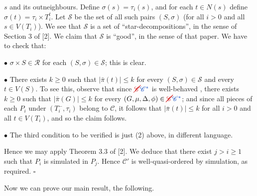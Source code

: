 \noindent $s$ and its outneighbours. Define $\sigma(s) = \tau_i(s)$, and for each $t \in N(s)$ define $\sigma(t) = \tau_i \times T_i^t$. Let $\mathscr{S}$ be the set of all such pairs $(S, \sigma)$ (for all $i > 0$ and all $s \in V(T_i)$). We see that $\mathscr{S}$ is a set of ``star-decompositions'', in the sense of Section 3 of [2]. We claim that $\mathscr{S}$ is ``good'', in the sense of that paper. We have to check that:

\hspace*{12pt}$\bullet$ $\sigma \times S \in \mathscr{R}$ for each $(S, \sigma) \in \mathscr{S}$; this is clear.

\hspace*{12pt}$\bullet$ There exists $k \ge 0$ such that $|\bar{\pi}(t)| \le k$ for every $(S, \sigma) \in \mathscr{S}$ and every $t \in V(S)$. To see this, observe that since $\delm{\mathscr{C}}\fix{\mathscr{C}^*}$ is well-behaved , there exists $k \ge 0$ such that $|\bar{\pi}(G)| \le k$ for every $(G, \mu, \Delta, \phi) \in \delm{\mathscr{C}}\fix{\mathscr{C}^*}$; and since all pieces of each $P_i$ under $(T_i^-, \tau_i)$ belong to $\mathscr{C}$, it follows that $|\bar{\pi}(t)| \le k$ for all $i > 0$ and all $t \in V(T_i)$, and so the claim follows.

\hspace*{12pt}$\bullet$ The third condition to be verified is just (2) above, in different language.

Hence we may apply Theorem 3.3 of [2]. We deduce that there exist $j > i \ge 1$ such that $P_i$ is simulated in $P_j$. Hence $\mathscr{C}'$ is well-quasi-ordered by simulation, as required. $\square$

Now we can prove our main result, the following.

